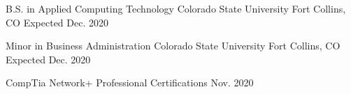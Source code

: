 



\begin{cventries}
  \cventry
    {B.S. in Applied Computing Technology} %
    {Colorado State University} %
    {Fort Collins, CO} %
    {Expected Dec. 2020} %
    {}

    \cventry
    {Minor in Business Administration} %
    {Colorado State University} %
    {Fort Collins, CO} %
    {Expected Dec. 2020} %
    {}

  \certentry
    {CompTia Network+} %
    {Professional Certifications} %
    {Nov. 2020} %
	{ }
	{ }
\end{cventries}
